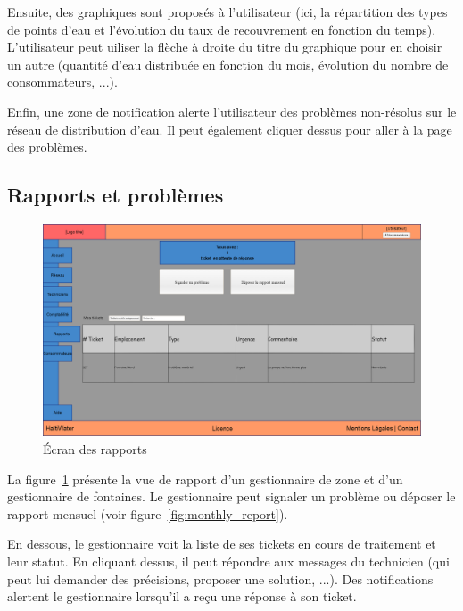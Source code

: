 \documentclass[a4paper, 11pt]{article}
\begin{document}
    Ensuite, des graphiques sont proposés à l'utilisateur (ici, la répartition des types de points d'eau et l'évolution du taux de recouvrement en fonction du temps). L'utilisateur peut uiliser la flèche à droite du titre du graphique pour en choisir un autre (quantité d'eau distribuée en fonction du mois, évolution du nombre de consommateurs, ...).

    Enfin, une zone de notification alerte l'utilisateur des problèmes non-résolus sur le réseau de distribution d'eau. Il peut également cliquer dessus pour aller à la page des problèmes.

  \subsection{Rapports et problèmes}
    \begin{figure}[H]
        \includegraphics[width=\textwidth]{Cahier_des_Charges/rapports}
        \caption{\'Ecran des rapports}
        \label{fig:report}
    \end{figure}
    La figure~\ref{fig:report} présente la vue de rapport d'un gestionnaire de zone et d'un gestionnaire de fontaines. Le gestionnaire peut signaler un problème ou déposer le rapport mensuel (voir figure~\ref{fig:monthly_report}).

    En dessous, le gestionnaire voit la liste de ses tickets en cours de traitement et leur statut. En cliquant dessus, il peut répondre aux messages du technicien (qui peut lui demander des précisions, proposer une solution, ...). Des notifications alertent le gestionnaire lorsqu'il a reçu une réponse à son ticket.
\end{document}

